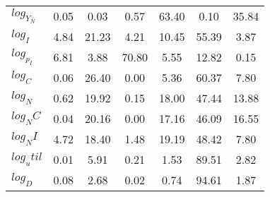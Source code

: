 \begin{center}
\begin{longtable}{lcccccc}
$log_Y_N   $	 & 	        0.05	 & 	        0.03	 & 	        0.57	 & 	       63.40	 & 	        0.10	 & 	       35.84 \\ 
$log_I     $	 & 	        4.84	 & 	       21.23	 & 	        4.21	 & 	       10.45	 & 	       55.39	 & 	        3.87 \\ 
$log_p_I   $	 & 	        6.81	 & 	        3.88	 & 	       70.80	 & 	        5.55	 & 	       12.82	 & 	        0.15 \\ 
$log_C     $	 & 	        0.06	 & 	       26.40	 & 	        0.00	 & 	        5.36	 & 	       60.37	 & 	        7.80 \\ 
$log_N     $	 & 	        0.62	 & 	       19.92	 & 	        0.15	 & 	       18.00	 & 	       47.44	 & 	       13.88 \\ 
$log_NC    $	 & 	        0.04	 & 	       20.16	 & 	        0.00	 & 	       17.16	 & 	       46.09	 & 	       16.55 \\ 
$log_NI    $	 & 	        4.72	 & 	       18.40	 & 	        1.48	 & 	       19.19	 & 	       48.42	 & 	        7.80 \\ 
$log_util  $	 & 	        0.01	 & 	        5.91	 & 	        0.21	 & 	        1.53	 & 	       89.51	 & 	        2.82 \\ 
$log_D     $	 & 	        0.08	 & 	        2.68	 & 	        0.02	 & 	        0.74	 & 	       94.61	 & 	        1.87 \\ 
\end{longtable}
 \end{center}
